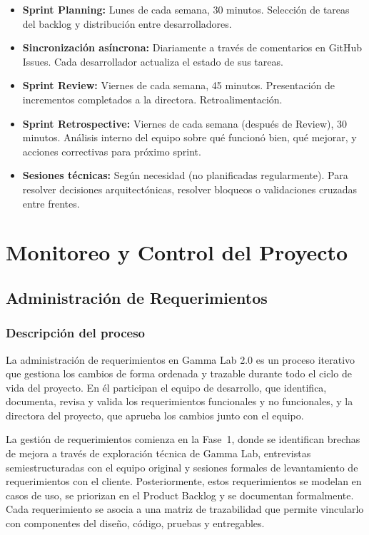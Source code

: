 \documentclass{article}
\begin{document}
\begin{itemize}
    \item \textbf{Sprint Planning:} Lunes de cada semana, 30 minutos. Selección de tareas del backlog y distribución entre desarrolladores.
    
    \item \textbf{Sincronización asíncrona:} Diariamente a través de comentarios en GitHub Issues. Cada desarrollador actualiza el estado de sus tareas.
    
    \item \textbf{Sprint Review:} Viernes de cada semana, 45 minutos. Presentación de incrementos completados a la directora. Retroalimentación.
    
    \item \textbf{Sprint Retrospective:} Viernes de cada semana (después de Review), 30 minutos. Análisis interno del equipo sobre qué funcionó bien, qué mejorar, y acciones correctivas para próximo sprint.
    
    \item \textbf{Sesiones técnicas:} Según necesidad (no planificadas regularmente). Para resolver decisiones arquitectónicas, resolver bloqueos o validaciones cruzadas entre frentes.
\end{itemize}


\clearpage


\section{Monitoreo y Control del Proyecto}

\subsection{Administración de Requerimientos}

\subsubsection*{Descripción del proceso}

La administración de requerimientos en Gamma Lab 2.0 es un proceso iterativo
que gestiona los cambios de forma ordenada y trazable durante todo el ciclo de
vida del proyecto. En él participan el equipo de desarrollo, que identifica,
documenta, revisa y valida los requerimientos funcionales y no funcionales, y la
directora del proyecto, que aprueba los cambios junto con el equipo.

La gestión de requerimientos comienza en la Fase~1, donde se identifican
brechas de mejora a través de exploración técnica de Gamma Lab,
entrevistas semiestructuradas con el equipo original y sesiones formales de
levantamiento de requerimientos con el cliente. Posteriormente, estos
requerimientos se modelan en casos de uso, se priorizan en el Product Backlog
y se documentan formalmente. Cada requerimiento se asocia a una matriz de
trazabilidad que permite vincularlo con componentes del diseño, código,
pruebas y entregables.
\end{document}
